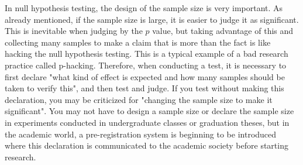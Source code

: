 \documentclass{ltjsbook}
\begin{document}
In null hypothesis testing, the design of the sample size is very important. As already mentioned, if the sample size is large, it is easier to judge it as significant. This is inevitable when judging by the $p$ value, but taking advantage of this and collecting many samples to make a claim that is more than the fact is like hacking the null hypothesis testing. This is a typical example of a bad research practice called p-hacking. Therefore, when conducting a test, it is necessary to first declare "what kind of effect is expected and how many samples should be taken to verify this", and then test and judge. If you test without making this declaration, you may be criticized for "changing the sample size to make it significant". You may not have to design a sample size or declare the sample size in experiments conducted in undergraduate classes or graduation theses, but in the academic world, a pre-registration system is beginning to be introduced where this declaration is communicated to the academic society before starting research.
\end{document}

